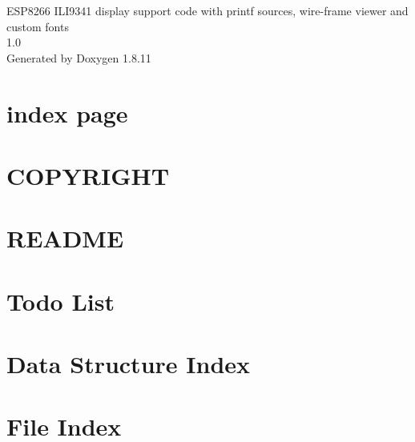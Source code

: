 \documentclass[twoside]{book}
\newcommand{\+}{\discretionary{\mbox{\scriptsize$\hookleftarrow$}}{}{}}
\newcommand{\clearemptydoublepage}{%
  \newpage{\pagestyle{empty}\cleardoublepage}%
}
\begin{document}
\hypersetup{pageanchor=false,
             bookmarksnumbered=true,
             pdfencoding=unicode
            }
\begin{titlepage}
\vspace*{7cm}
\begin{center}%
{\Large E\+S\+P8266 I\+L\+I9341 display support code with printf sources, wire-\/frame viewer and custom fonts \\[1ex]\large 1.\+0 }\\
\vspace*{1cm}
{\large Generated by Doxygen 1.8.11}\\
\end{center}
\end{titlepage}
\clearemptydoublepage
\tableofcontents
\clearemptydoublepage
{}
\hypersetup{pageanchor=true}

\chapter{index page}
\label{index}\hypertarget{index}{}
\chapter{C\+O\+P\+Y\+R\+I\+G\+HT}
\label{md_COPYRIGHT}
\hypertarget{md_COPYRIGHT}{}

\chapter{R\+E\+A\+D\+ME}
\label{md_README}
\hypertarget{md_README}{}

\chapter{Todo List}
\label{todo}
\hypertarget{todo}{}

\chapter{Data Structure Index}

\chapter{File Index}

\end{document}
